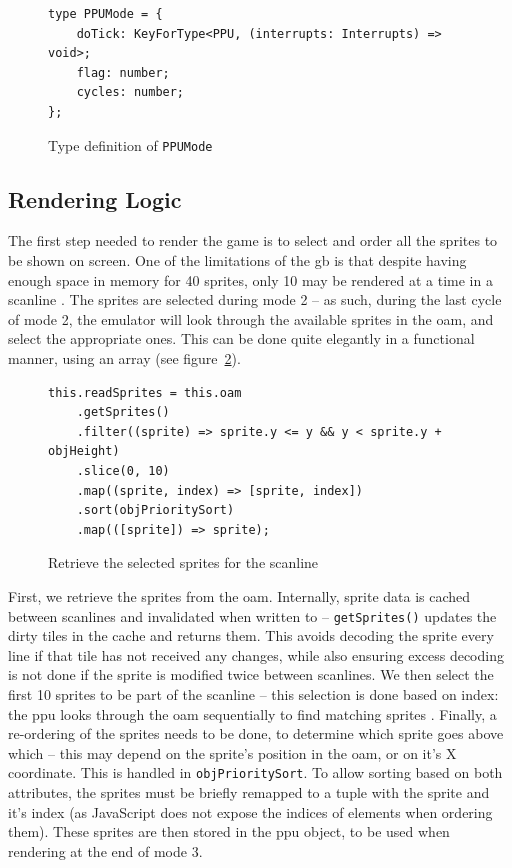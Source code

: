 \documentclass[11pt]{informatics-report}
\begin{document}
\begin{figure}[h]
    \begin{verbatim}
type PPUMode = {
    doTick: KeyForType<PPU, (interrupts: Interrupts) => void>;
    flag: number;
    cycles: number;
};
    \end{verbatim}
    \caption{Type definition of \texttt{PPUMode}}
    \label{fig:stat-mode-type}
\end{figure}

\subsection{Rendering Logic}

The first step needed to render the game is to select and order all the sprites to be shown on screen. One of the limitations of the \gls{gb} is that despite having enough space in memory for 40 sprites, only 10 may be rendered at a time in a scanline \cite[OAM]{pandoc}. The sprites are selected during mode 2 -- as such, during the last cycle of mode 2, the emulator will look through the available sprites in the \gls{oam}, and select the appropriate ones. This can be done quite elegantly in a functional manner, using an array (see figure~\ref{fig:sprite-select}).

\begin{figure}[h]
    \begin{verbatim}
this.readSprites = this.oam
    .getSprites()
    .filter((sprite) => sprite.y <= y && y < sprite.y + objHeight)
    .slice(0, 10)
    .map((sprite, index) => [sprite, index])
    .sort(objPrioritySort)
    .map(([sprite]) => sprite);
    \end{verbatim}
    \caption{Retrieve the selected sprites for the scanline}
    \label{fig:sprite-select}
\end{figure}

First, we retrieve the sprites from the \gls{oam}. Internally, sprite data is cached between scanlines and invalidated when written to -- \texttt{getSprites()} updates the dirty tiles in the cache and returns them. This avoids decoding the sprite every line if that tile has not received any changes, while also ensuring excess decoding is not done if the sprite is modified twice between scanlines. We then select the first 10 sprites to be part of the scanline -- this selection is done based on index: the \gls{ppu} looks through the \gls{oam} sequentially to find matching sprites \cite[OAM]{pandoc}. Finally, a re-ordering of the sprites needs to be done, to determine which sprite goes above which -- this may depend on the sprite's position in the \gls{oam}, or on it's X coordinate. This is handled in \texttt{objPrioritySort}. To allow sorting based on both attributes, the sprites must be briefly remapped to a tuple with the sprite and it's index (as JavaScript does not expose the indices of elements when ordering them). These sprites are then stored in the \gls{ppu} object, to be used when rendering at the end of mode 3.
\end{document}

